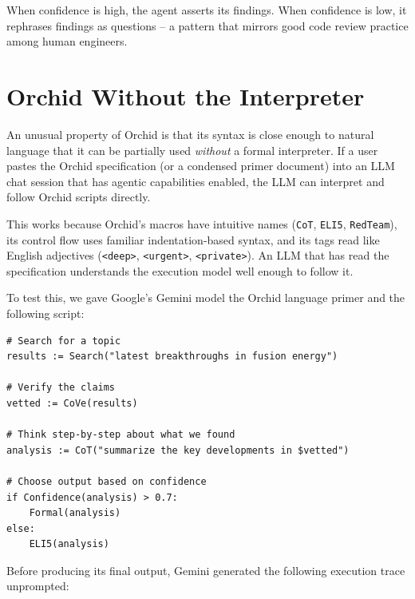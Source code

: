 \documentclass[11pt,a4paper]{article}
\begin{document}
When confidence is high, the agent asserts its findings. When confidence is low, it rephrases findings as questions -- a pattern that mirrors good code review practice among human engineers.

\section{Orchid Without the Interpreter}

An unusual property of Orchid is that its syntax is close enough to natural language that it can be partially used \emph{without} a formal interpreter. If a user pastes the Orchid specification (or a condensed primer document) into an LLM chat session that has agentic capabilities enabled, the LLM can interpret and follow Orchid scripts directly.

This works because Orchid's macros have intuitive names (\texttt{CoT}, \texttt{ELI5}, \texttt{RedTeam}), its control flow uses familiar indentation-based syntax, and its tags read like English adjectives (\texttt{<deep>}, \texttt{<urgent>}, \texttt{<private>}). An LLM that has read the specification understands the execution model well enough to follow it.

To test this, we gave Google's Gemini model the Orchid language primer and the following script:

\begin{lstlisting}[language=orchid]
# Search for a topic
results := Search("latest breakthroughs in fusion energy")

# Verify the claims
vetted := CoVe(results)

# Think step-by-step about what we found
analysis := CoT("summarize the key developments in $vetted")

# Choose output based on confidence
if Confidence(analysis) > 0.7:
    Formal(analysis)
else:
    ELI5(analysis)
\end{lstlisting}

Before producing its final output, Gemini generated the following execution trace unprompted:
\end{document}
